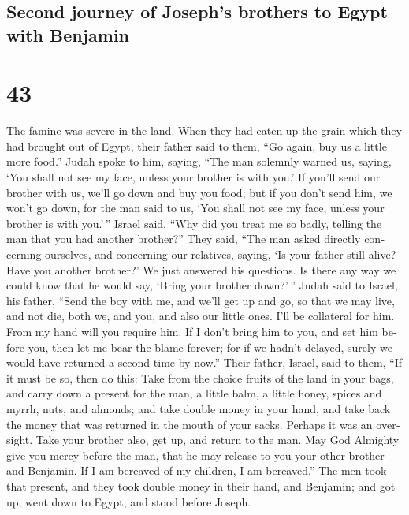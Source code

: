 \begin{paracol}{2}
\begin{otherlanguage}{english}
\hypertarget{second-journey-of-josephs-brothers-to-egypt-with-benjamin}{%
\subsection{Second journey of Joseph's brothers to Egypt with
Benjamin}\label{second-journey-of-josephs-brothers-to-egypt-with-benjamin}}

\hypertarget{section-85}{%
\section{43}\label{section-85}}

 The famine was severe in the land.  When
they had eaten up the grain which they had brought out of Egypt, their
father said to them, ``Go again, buy us a little more food.''
 Judah spoke to him, saying, ``The man solemnly warned us,
saying, `You shall not see my face, unless your brother is with you.'
 If you'll send our brother with us, we'll go down and buy
you food;  but if you don't send him, we won't go down,
for the man said to us, `You shall not see my face, unless your brother
is with you.'\,''  Israel said, ``Why did you treat me so
badly, telling the man that you had another brother?'' 
They said, ``The man asked directly concerning ourselves, and concerning
our relatives, saying, `Is your father still alive? Have you another
brother?' We just answered his questions. Is there any way we could know
that he would say, `Bring your brother down?'\,''  Judah
said to Israel, his father, ``Send the boy with me, and we'll get up and
go, so that we may live, and not die, both we, and you, and also our
little ones.  I'll be collateral for him. From my hand
will you require him. If I don't bring him to you, and set him before
you, then let me bear the blame forever;  for if we
hadn't delayed, surely we would have returned a second time by now.''
 Their father, Israel, said to them, ``If it must be so,
then do this: Take from the choice fruits of the land in your bags, and
carry down a present for the man, a little balm, a little honey, spices
and myrrh, nuts, and almonds;  and take double money in
your hand, and take back the money that was returned in the mouth of
your sacks. Perhaps it was an oversight.  Take your
brother also, get up, and return to the man.  May God
Almighty give you mercy before the man, that he may release to you your
other brother and Benjamin. If I am bereaved of my children, I am
bereaved.''  The men took that present, and they took
double money in their hand, and Benjamin; and got up, went down to
Egypt, and stood before Joseph.


\end{otherlanguage}
\end{paracol}
